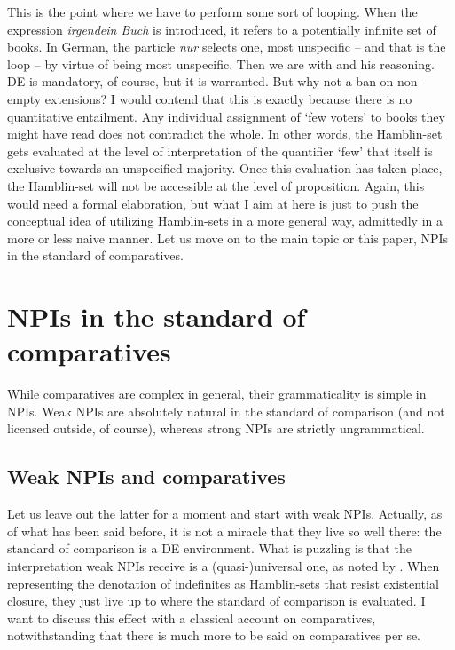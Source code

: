 \documentclass[output=paper,colorlinks,citecolor=brown,
]{langscibook}
\begin{document}
This is the point where we have to perform some sort of looping. When the expression \textit{irgendein Buch} is
introduced, it refers to a potentially infinite set of books. In German, the particle \textit{nur} selects one, most
unspecific -- and that is the loop -- by virtue of being most unspecific. Then we are with \citet{krifka1995} and his
reasoning. DE is mandatory, of course, but it is warranted. But why not a ban on non-empty extensions? I would contend
that this is exactly because there is no quantitative entailment. Any individual assignment of `few voters' to books they
might have read does not contradict the whole. In other words, the Hamblin-set gets evaluated at the level of
interpretation of the quantifier `few' that itself is exclusive towards an unspecified majority. Once this evaluation
has taken place, the Hamblin-set will not be accessible at the level of proposition. Again, this would need a formal elaboration, but
what I aim at here is just to push the conceptual idea of utilizing Hamblin-sets in a more general way, admittedly in a more
or less naive manner. Let us move on to the main topic or this paper, NPIs in the standard of comparatives.

\section{NPIs in the standard of comparatives}

While comparatives are complex in general, their grammaticality is simple in NPIs. Weak NPIs
are absolutely natural in the standard of comparison (and not licensed outside, of course), whereas strong NPIs are strictly ungrammatical.

\subsection{Weak NPIs and comparatives}

Let us leave out the latter for a moment and start with weak NPIs. Actually, as of what has been said before, it is not
a miracle that they live so well there: the standard of comparison is a DE environment. What is puzzling is that the
interpretation weak NPIs receive is a (quasi-)universal one, as noted by \citet{schwarzschwilk2002}. When representing
the denotation of indefinites as Hamblin-sets that resist existential closure, they just live up to where the standard
of comparison is evaluated. I want to discuss
this effect with a classical account on comparatives, notwithstanding that there is much more to be said on
comparatives per se.
\end{document}
